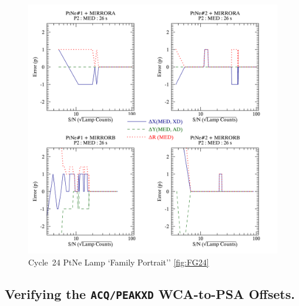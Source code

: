 \documentclass{stsci_report}
\newcommand{\tacq}[1]{\texttt{ACQ/#1}}
\begin{document}
\begin{figure}[htb]
\noindent\includegraphics*[width=0.795\linewidth]{png/C24_14857_Error_vs_lampSN.png}
\caption{Cycle~24 PtNe Lamp `Family Portrait'' \ref{fig:FG24}}
\end{figure}
\clearpage
\subsection{Verifying the \tacq{PEAKXD} WCA-to-PSA Offsets.} \label{subsec:acqpeakxd}
\end{document}
